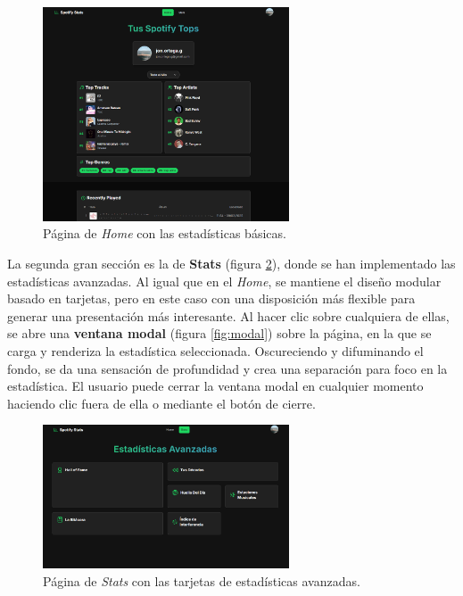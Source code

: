\begin{figure}[H]
    \centering
    \includegraphics[width=0.65\textwidth]{figures/capturas_ui/home.png}
    \vspace{0.3cm}
    \caption{Página de \textit{Home} con las estadísticas básicas.}
    \label{fig:home}
\end{figure}

La segunda gran sección es la de \textbf{Stats} (figura \ref{fig:stats}), donde se han implementado las estadísticas avanzadas. Al igual que en el \textit{Home}, se mantiene el diseño modular basado en tarjetas, pero en este caso con una disposición más flexible para generar una presentación más interesante. Al hacer clic sobre cualquiera de ellas, se abre una \textbf{ventana modal} (figura \ref{fig:modal}) sobre la página, en la que se carga y renderiza la estadística seleccionada. Oscureciendo y difuminando el fondo, se da una sensación de profundidad y crea una separación para foco en la estadística. El usuario puede cerrar la ventana modal en cualquier momento haciendo clic fuera de ella o mediante el botón de cierre.

\begin{figure}[H]
    \centering
    \includegraphics[width=0.65\textwidth]{figures/capturas_ui/stats.png}
    \vspace{0.3cm}
    \caption{Página de \textit{Stats} con las tarjetas de estadísticas avanzadas.}
    \label{fig:stats}
\end{figure}

